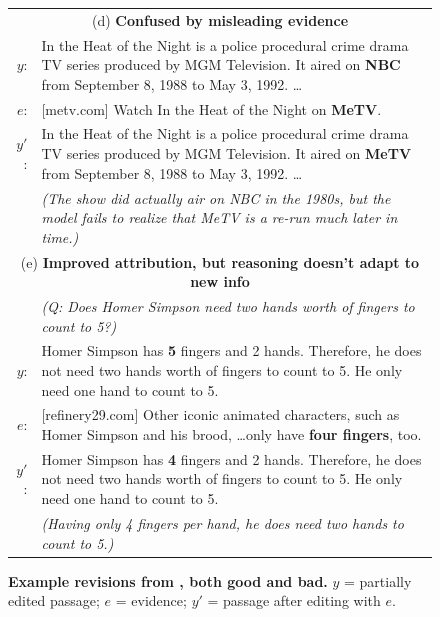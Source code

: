 \documentclass[11pt]{article}
\begin{document}
\begin{figure}[!t]
{\begin{tabular}{@{}r@{\hspace{4pt}}p{}@{}}
\midrule
\multicolumn{2}{c}{(d) \textbf{Confused by misleading evidence}} \\
$y$: & In the Heat of the Night is a police procedural crime drama TV series produced by MGM Television. It aired on {\color{blue}\textbf{NBC}} from September 8, 1988 to May 3, 1992. \dots \\
$e$: & [metv.com] Watch In the Heat of the Night on \textbf{MeTV}. \\
$y'$: & In the Heat of the Night is a police procedural crime drama TV series produced by MGM Television. It aired on {\color{red}\textbf{MeTV}} from September 8, 1988 to May 3, 1992. \dots \\
& \emph{(The show did actually air on NBC in the 1980s, but the model fails to realize that MeTV is a re-run much later in time.)} \\
\midrule
\multicolumn{2}{c}{(e) \textbf{Improved attribution, but reasoning doesn't adapt to new info}} \\
& \textit{(Q: Does Homer Simpson need two hands worth of fingers to count to 5?)} \\
$y$: & Homer Simpson has {\color{red}\textbf{5}} fingers and 2 hands. Therefore, he does not need two hands worth of fingers to count to 5. He only need one hand to count to 5. \\
$e$: & [refinery29.com] Other iconic animated characters, such as Homer Simpson and his brood, \dots only have \textbf{four fingers}, too.\\
$y'$: & Homer Simpson has {\color{blue}\textbf{4}} fingers and 2 hands. Therefore, he does not need two hands worth of fingers to count to 5. He only need one hand to count to 5. \\
& \emph{(Having only  4 fingers per hand, he does need two hands to count to 5.)} \\

\bottomrule
\end{tabular}
}
\begin{subfigure}{0pt}\label{fig:interesting_examples_entity}\end{subfigure}
\begin{subfigure}{0pt}\label{fig:interesting_examples_number}\end{subfigure}
\begin{subfigure}{0pt}\label{fig:interesting_examples_logic}\end{subfigure}
\begin{subfigure}{0pt}\label{fig:interesting_examples_misleading}\end{subfigure}
\begin{subfigure}{0pt}\label{fig:interesting_examples_reasoning_unchanged}\end{subfigure}
\caption{
\label{fig:interesting_examples}
\textbf{Example revisions  from \approach{}, both good and bad.}
$y$ = partially edited passage; $e$ = evidence; $y'$ = passage after editing with $e$.
}
\end{figure}
\end{document}
